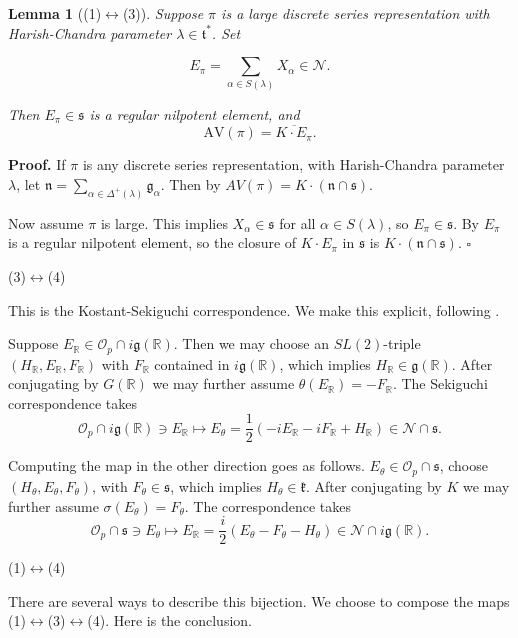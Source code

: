 \documentclass[10pt,leqno]{article}
\newtheorem{lemma}[equation]{Lemma}
\newcommand{\qed}{\hfill $\square$ \medskip}
\newenvironment{proof}[1][Proof]{\noindent\textbf{#1.} }{\qed}
\renewcommand{\O}{\mathcal O}
\newcommand{\R}{\mathbb R}
\newcommand{\N}{\mathcal N}
\newcommand{\n}{\mathfrak n}
\renewcommand{\k}{\mathfrak k}
\renewcommand{\t}{\mathfrak t}
\newcommand{\g}{\mathfrak g}
\newcommand{\s}{\mathfrak s}
\newcommand{\AV}{\mathrm{AV}}
\newcommand{\Op}{\O_p}
\begin{document}
\begin{lemma}[(1)$\leftrightarrow$(3)]
Suppose $\pi$ is a large discrete series representation with Harish-Chandra parameter $\lambda\in\t^*$.
Set

\begin{equation}
  \label{e:Epi}
  E_\pi=\sum_{\alpha\in S(\lambda)}X_\alpha\in \N.
\end{equation}

Then $E_\pi\in\s$ is a regular nilpotent element, and
$$
\AV(\pi)=\overline{K\cdot E_\pi}.
$$
\end{lemma}

\begin{proof}
If $\pi$ is any discrete series representation, with Harish-Chandra parameter $\lambda$, let
$\n=\sum_{\alpha\in\Delta^+(\lambda)}\g_\alpha$.
Then by \cite[Proposition 6.8]{vogan_irreducibility} $AV(\pi)=K\cdot(\n\cap\s)$. 

Now assume $\pi$ is large. This implies $X_\alpha\in\s$ for all $\alpha\in S(\lambda)$, so $E_\pi\in \s$. 
By \cite{kostant_tds} $E_\pi$ is a regular nilpotent element, so the closure of $K\cdot E_\pi$ in $\s$ is $K\cdot(\n\cap\s)$. 
\end{proof}

\medskip

\noindent (3)$\leftrightarrow$(4)

This is the Kostant-Sekiguchi correspondence. We make this explicit, following \cite[Section 1]{avav}.

Suppose $E_\R\in \Op\cap i\g(\R)$. Then we may choose an $SL(2)$-triple $(H_\R,E_\R,F_\R)$ with $F_\R$  contained in $i\g(\R)$,
which implies $H_\R\in \g(\R)$. 
After conjugating by $G(\R)$ we may further assume $\theta(E_\R)=-F_\R$.
The Sekiguchi correspondence takes
$$
\Op\cap i\g(\R)\ni E_\R\mapsto E_\theta=\frac12(-iE_\R-iF_\R+H_\R)\in \N\cap \s.
$$


Computing the map in the other direction goes as follows.
$E_\theta\in \Op\cap\s$, choose $(H_\theta,E_\theta,F_\theta)$, with
$F_\theta\in\s$, which implies $H_\theta\in\k$. After conjugating by $K$ we may further assume $\sigma(E_\theta)=F_\theta$.
The correspondence takes
$$
\Op\cap\s\ni E_\theta\mapsto E_\R=\frac i2(E_\theta-F_\theta-H_\theta)\in\N\cap i\g(\R).
$$

\medskip

\noindent (1)$\leftrightarrow$(4)

There are several ways to describe this bijection. We choose to compose the maps (1)$\leftrightarrow$(3)$\leftrightarrow$(4).
Here is the conclusion.
\end{document}
